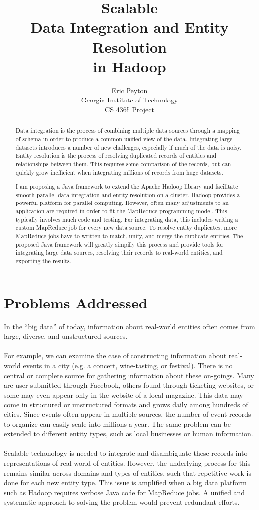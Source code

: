 \documentclass[12pt]{article}
\title{Scalable\\ Data Integration and Entity Resolution\\in Hadoop}
\author{Eric Peyton\\
\small Georgia Institute of Technology\\
\small CS 4365 Project\\
}
\begin{document}
\maketitle

\begin{abstract}
Data integration is the process of combining multiple data sources through a mapping of schema in order to produce a common unified view of the data. Integrating large datasets introduces a number of new challenges, especially if much of the data is noisy. Entity resolution is the process of resolving duplicated records of entities and relationships between them. This requires some comparison of the records, but can quickly grow inefficient when integrating millions of records from huge datasets. 

I am proposing a Java framework to extend the Apache Hadoop library and facilitate smooth parallel data integration and entity resolution on a cluster. Hadoop provides a powerful platform for parallel computing. However, often many adjustments to an application are required in order to fit the MapReduce programming model. This typically involves much code and testing. For integrating data, this includes writing a custom MapReduce job for every new data source. To resolve entity duplicates, more MapReduce jobs have to written to match, unify, and merge the duplicate entities. The proposed Java framework will greatly simpifly this process and provide tools for integrating large data sources, resolving their records to real-world entities, and exporting the results.
\end{abstract}
\section{Problems Addressed}
In the ``big data'' of today, information about real-world entities often comes from large, diverse, and unstructured sources. \\\\
For example,  we can examine the case of constructing information about real-world events in a city (e.g. a concert, wine-tasting, or festival). 
There is no central or complete source for gathering information about these on-goings. Many are user-submitted through Facebook, others found through ticketing websites, or some may even appear only in the website of a local magazine. 
This data may come in structured or unstructured formats and grows daily among hundreds of cities. 
Since events often appear in multiple sources, the number of event records to organize can easily scale into millions a year. 
The same problem can be extended to different entity types, such as local businesses or human information.\\\\
Scalable techonology is needed to integrate and disambiguate these records into representations of real-world of entities. However, the underlying process for this remains similar across domains and types of entities, such that repetitive work is done for each new entity type. This issue is amplified when a big data platform such as Hadoop requires verbose Java code for MapReduce jobs. A unified and systematic approach to solving the problem would prevent redundant efforts.
\end{document}
